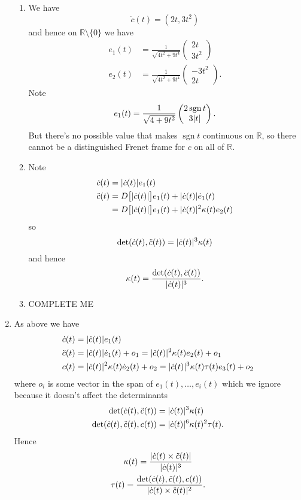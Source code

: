 \documentclass[a4paper, 12pt]{article}
\newcommand{\R}{\mathbb{R}}
\DeclarePairedDelimiter\abs{\lvert}{\rvert}
\DeclareMathOperator{\sgn}{sgn}
\let\dddot\relax
\begin{document}
\begin{enumerate}
\begin{enumerate}
\item We have
\[\dot c(t)=(2t,3t^2)\]
and hence on \(\R\setminus\{0\}\) we have
\begin{align*}
e_1(t)&=\frac1{\sqrt{4t^2+9t^4}}\begin{pmatrix}2t\\3t^2\end{pmatrix}\\
e_2(t)&=\frac1{\sqrt{4t^2+9t^4}}\begin{pmatrix}-3t^2\\2t\end{pmatrix}.
\end{align*}
Note
\[e_1(t)=\frac1{\sqrt{4+9t^2}}\begin{pmatrix}2\sgn t\\3\abs{t}\end{pmatrix}.\]
But there's no possible value that makes \(\sgn t\) continuous on \(\R\), so there cannot be a distinguished Frenet frame for \(c\) on all of \(\R\).

\item Note
\begin{align*}
\dot c(t)&=\abs{\dot c(t)}e_1(t)\\
\ddot c(t)&=D\big[\abs{\dot c(t)}\big]e_1(t)+\abs{\dot c(t)}\dot e_1(t)\\
&=D\big[\abs{\dot c(t)}\big]e_1(t)+\abs{\dot c(t)}^2\kappa(t)e_2(t)
\end{align*}
so
\[\det(\dot c(t),\ddot c(t))=\abs{\dot c(t)}^3\kappa(t)\]
and hence
\[\kappa(t)=\frac{\det(\dot c(t),\ddot c(t))}{\abs{\dot c(t)}^3}.\]

\item {\color{red} COMPLETE ME}

\end{enumerate}

\item As above we have
\begin{align*}
\dot c(t)&=\abs{\dot c(t)}e_1(t)\\
\ddot c(t)&=\abs{\dot c(t)}\dot e_1(t)+o_1=\abs{\dot c(t)}^2\kappa(t)e_2(t)+o_1\\
\dddot c(t)&=\abs{\dot c(t)}^2\kappa(t)\dot e_2(t)+o_2=\abs{\dot c(t)}^3\kappa(t)\tau(t)e_3(t)+o_2
\end{align*}
where \(o_i\) is some vector in the span of \(e_1(t),\dots,e_i(t)\) which we ignore because it doesn't affect the determinants
\begin{align*}
\det(\dot c(t),\ddot c(t))&=\abs{\dot c(t)}^3\kappa(t)\\
\det(\dot c(t),\ddot c(t),\dddot c(t))&=\abs{\dot c(t)}^6\kappa(t)^2\tau(t).
\end{align*}
Hence
\begin{gather*}
\kappa(t)=\frac{\abs{\dot c(t)\times\ddot c(t)}}{\abs{\dot c(t)}^3}\\
\tau(t)=\frac{\det(\dot c(t),\ddot c(t),\dddot c(t))}{\abs{\dot c(t)\times\ddot c(t)}^2}.
\end{gather*}


\end{enumerate}
\end{document}
